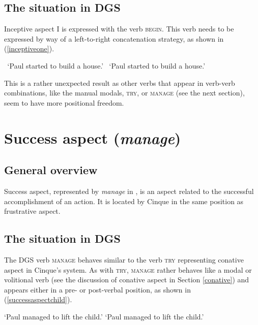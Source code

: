 \subsection{The situation in DGS}
Inceptive aspect I is expressed with the verb \textsc{begin}. This verb needs to be expressed by way of a left-to-right concatenation strategy, as shown in (\ref{inceptiveone}).

\begin{exe}
\ex  \label{inceptiveone}\begin{xlist} 
\glt \textcolor{white}{?}`Paul started to build a house.' \label{ex:inceptiveonea}
\glt \textcolor{white}{?}`Paul started to build a house.' \label{ex:inceptiveoneb}
\end{xlist}
\end{exe} 

\noindent This is a rather unexpected result as other verbs that appear in verb-verb combinations, like the manual modals, \textsc{try}, or \textsc{manage} (see the next section), seem to have more positional freedom.

\section{Success aspect (\textit{manage})}
\subsection{General overview}
Success aspect, represented by \textit{manage} in \citet{cinque1999adverbs, cinque2006restructuring}, is an aspect related to the successful accomplishment of an action. It is located by Cinque in the same position as frustrative aspect. 

\subsection{The situation in DGS}
The DGS verb \textsc{manage} behaves similar to the verb \textsc{try} representing conative aspect in Cinque's system. As with \textsc{try}, \textsc{manage} rather behaves like a modal or volitional verb (see the discussion of conative aspect in Section \ref{conative}) and appears either in a pre- or post-verbal position, as shown in (\ref{successaspectchild}).

\begin{exe}
\ex  \label{successaspectchild}\begin{xlist} 
\glt `Paul managed to lift the child.' \label{ex:successaspecta}
\glt `Paul managed to lift the child.' \label{ex:successaspectb}
\end{xlist}
\end{exe} 


